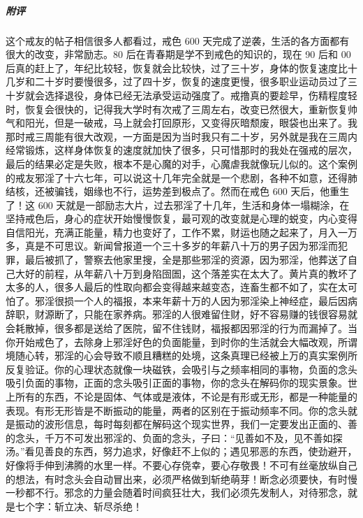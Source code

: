 \begin{case}
    \subparagraph{附评} 这个戒友的帖子相信很多人都看过，戒色 600 天完成了逆袭，生活的各方面都有很大的改变，非常励志。80 后在青春期是学不到戒色的知识的，现在 90 后和 00 后真的赶上了，年纪比较轻，恢复就会比较快，过了三十岁，身体的恢复速度比十几岁和二十岁时要慢很多，过了四十岁，恢复的速度更慢，很多职业运动员过了三十岁就会选择退役，身体已经无法承受运动强度了。戒撸真的要趁早，伤精程度轻时，恢复会很快的，记得我大学时有次戒了三周左右，改变已然很大，重新恢复帅气和阳光，但是一破戒，马上就会打回原形，又变得灰暗颓废，眼袋也出来了。我那时戒三周能有很大改观，一方面是因为当时我只有二十岁，另外就是我在三周内经常锻炼，这样身体恢复的速度就加快了很多，只可惜那时的我处在强戒的层次，最后的结果必定是失败，根本不是心魔的对手，心魔虐我就像玩儿似的。这个案例的戒友邪淫了十六七年，可以说这十几年完全就是一个悲剧，各种不如意，还得肺结核，还被骗钱，姻缘也不行，运势差到极点了。然而在戒色 600 天后，他重生了！这 600 天就是一部励志大片，过去邪淫了十几年，生活和身体一塌糊涂，在坚持戒色后，身心的症状开始慢慢恢复，最可观的改变就是心理的蜕变，内心变得自信阳光，充满正能量，精力也变好了，工作不累，财运也随之起来了，月入一万多，真是不可思议。新闻曾报道一个三十多岁的年薪八十万的男子因为邪淫而犯罪，最后被抓了，警察去他家里搜，全是那些邪淫的资源，因为邪淫，他葬送了自己大好的前程，从年薪八十万到身陷囹圄，这个落差实在太大了。黄片真的教坏了太多的人，很多人最后的性取向都会变得越来越变态，连畜生都不如了，实在太可怕了。邪淫很损一个人的福报，本来年薪十万的人因为邪淫染上神经症，最后因病辞职，财源断了，只能在家养病。邪淫的人很难留住财，好不容易赚的钱很容易就会耗散掉，很多都是送给了医院，留不住钱财，福报都因邪淫的行为而漏掉了。当你开始戒色了，去除身上邪淫好色的负面能量，到时你的生活就会大幅改观，所谓境随心转，邪淫的心会导致不顺且糟糕的处境，这条真理已经被上万的真实案例所反复验证。你的心理状态就像一块磁铁，会吸引与之频率相同的事物，负面的念头吸引负面的事物，正面的念头吸引正面的事物，你的念头在解码你的现实景象。世上所有的东西，不论是固体、气体或是液体，不论是有形或无形，都是一种能量的表现。有形无形皆是不断振动的能量，两者的区别在于振动频率不同。你的念头就是振动的波形信息，每时每刻都在解码这个现实世界，我们一定要发出正面的、善的念头，千万不可发出邪淫的、负面的念头，子曰：“见善如不及，见不善如探汤。”看见善良的东西，努力追求，好像赶不上似的；遇见邪恶的东西，使劲避开，好像将手伸到沸腾的水里一样。不要心存侥幸，要心存敬畏！不可有丝毫放纵自己的想法，有时念头会自动冒出来，必须严格做到斩绝萌芽！断念必须要快，有时慢一秒都不行。邪念的力量会随着时间疯狂壮大，我们必须先发制人，对待邪念，就是七个字：斩立决、斩尽杀绝！
\end{case}

